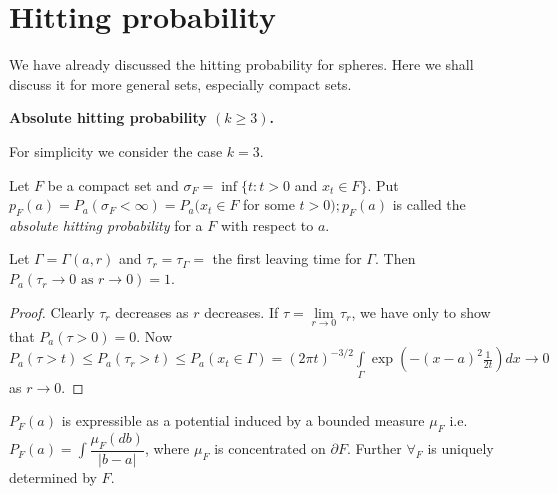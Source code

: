 \section{Hitting probability}\label{chap3-sec6} %
\pageoriginale

We have already discussed the hitting probability for spheres. Here we
shall discuss it for more general sets, especially compact sets. 

\medskip
\noindent
{\bf Absolute hitting probability {\boldmath$(k \geq 3)$}.}
\smallskip

For simplicity we consider the case $k = 3$.

Let $F$ be a compact set and $\sigma_F = \inf \{ t : t > 0$ and $x_t
\in F \}$. Put $p_F(a) = P_a (\sigma_F < \infty) = P_a (x_t \in F$ for
some $t > 0); p_F(a)$ is called the \textit{absolute hitting
  probability} for a $F$ with respect to $a$. 

\begin{lemma*}
Let $\Gamma = \Gamma (a, r)$ and $\tau_r = \tau_\Gamma =$ the first
  leaving time for $\Gamma$. Then $P_a (\tau_r \rightarrow 0
  \text{ \ as  \ } r \rightarrow 0) = 1$. 
\end{lemma*}

\begin{proof}
Clearly $\tau_r$ decreases as $r$ decreases. If $\tau = \lim\limits_{r \rightarrow 0} \tau_r$, we have only to show that $P_a
  (\tau > 0) = 0$. Now $P_a (\tau > t)  \leq P_a (\tau_r > t) \leq P_a
  (x_t \in \Gamma) = (2 \pi t)^{-3/2} \int\limits_{\Gamma} \exp (-(x-a)^{2}
  \frac{1}{2t}) dx \rightarrow 0$ as $r \rightarrow 0$. 
\end{proof}

\setcounter{thm}{0}
\begin{thm}\label{chap3-sec6-thm1}%
$P_F (a)$ is expressible as a potential induced by a bounded measure
  $\mu_F$ i.e. $P_F(a) = \int \dfrac{\mu_F (db)}{|b - a|}$, where
  $\mu_F$ is concentrated  on $\partial F$. Further $\forall_F$ is
  uniquely determined by $F$. 
\end{thm}

